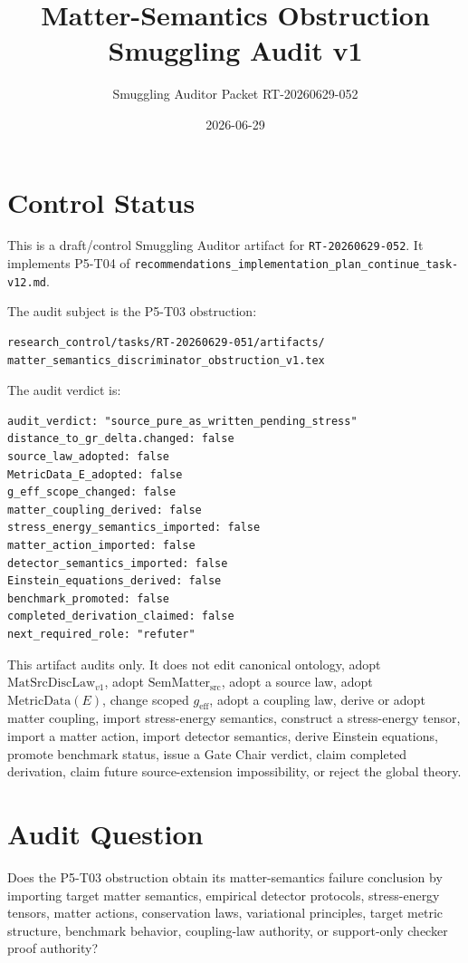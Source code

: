 \documentclass[11pt]{article}
\title{Matter-Semantics Obstruction Smuggling Audit v1}
\author{Smuggling Auditor Packet RT-20260629-052}
\date{2026-06-29}
\newcommand{\MetricData}{\mathrm{MetricData}}
\newcommand{\geff}{g_{\mathrm{eff}}}
\newcommand{\MatSrcDiscLaw}{\mathrm{MatSrcDiscLaw}_{v1}}
\newcommand{\SemMatterSrc}{\mathrm{SemMatter}_{\mathrm{src}}}
\begin{document}
\maketitle

\section{Control Status}

This is a draft/control Smuggling Auditor artifact for
\texttt{RT-20260629-052}. It implements P5-T04 of
\texttt{recommendations\_implementation\_plan\_continue\_task-v12.md}.

The audit subject is the P5-T03 obstruction:

\begin{verbatim}
research_control/tasks/RT-20260629-051/artifacts/
matter_semantics_discriminator_obstruction_v1.tex
\end{verbatim}

The audit verdict is:

\begin{verbatim}
audit_verdict: "source_pure_as_written_pending_stress"
distance_to_gr_delta.changed: false
source_law_adopted: false
MetricData_E_adopted: false
g_eff_scope_changed: false
matter_coupling_derived: false
stress_energy_semantics_imported: false
matter_action_imported: false
detector_semantics_imported: false
Einstein_equations_derived: false
benchmark_promoted: false
completed_derivation_claimed: false
next_required_role: "refuter"
\end{verbatim}

This artifact audits only. It does not edit canonical ontology, adopt
\(\MatSrcDiscLaw\), adopt \(\SemMatterSrc\), adopt a source law, adopt
\(\MetricData(E)\), change scoped \(\geff\), adopt a coupling law, derive or
adopt matter coupling, import stress-energy semantics, construct a
stress-energy tensor, import a matter action, import detector semantics,
derive Einstein equations, promote benchmark status, issue a Gate Chair
verdict, claim completed derivation, claim future source-extension
impossibility, or reject the global theory.

\section{Audit Question}

Does the P5-T03 obstruction obtain its matter-semantics failure conclusion by
importing target matter semantics, empirical detector protocols,
stress-energy tensors, matter actions, conservation laws, variational
principles, target metric structure, benchmark behavior, coupling-law
authority, or support-only checker proof authority?
\end{document}
